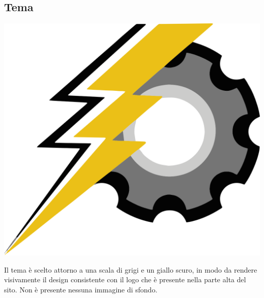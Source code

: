 \documentclass{article}
\begin{document}
\begin{large}
    \section{Tema}
        \begin{center}
        \includegraphics[scale=0.09]{teraware/vlogo.png}
        \end{center}
    Il tema è scelto attorno a una scala di grigi e un giallo scuro, in modo da rendere visivamente il design consistente con il logo che è presente nella parte alta del sito. Non è presente nessuna immagine di sfondo.

\end{large}
\end{document}
